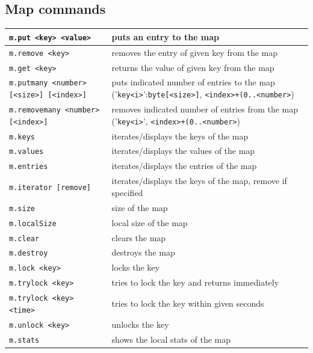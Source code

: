 \subsection*{Map commands}
\begin{tabular}{|p{4cm}|p{9cm}|}
    \hline
    \texttt{m.put <key> <value>} & puts an entry to the map\\\hline
    \texttt{m.remove <key>} & removes the entry of given key from the map\\\hline
    \texttt{m.get <key>} & returns the value of given key from the map\\\hline
    \texttt{m.putmany <number> [<size>] [<index>]} & puts indicated number of entries to the map ('\texttt{key<i>}':\texttt{byte[<size>]}, \texttt{<index>+(0..<number>})\\\hline
    \texttt{m.removemany <number> [<index>]} & removes indicated number of entries from the map ('\texttt{key<i>}', \texttt{<index>+(0..<number>})\\\hline
    \texttt{m.keys} & iterates/displays the keys of the map\\\hline
    \texttt{m.values} & iterates/displays the values of the map\\\hline
    \texttt{m.entries} & iterates/displays the entries of the map\\\hline
    \texttt{m.iterator [remove]} & iterates/displays the keys of the map, remove if specified\\\hline
    \texttt{m.size} & size of the map\\\hline
    \texttt{m.localSize} & local size of the map\\\hline
    \texttt{m.clear} & clears the map\\\hline
    \texttt{m.destroy} & destroys the map\\\hline
    \texttt{m.lock <key>} & locks the key\\\hline
    \texttt{m.trylock <key>} & tries to lock the key and returns immediately\\\hline
    \texttt{m.trylock <key> <time>} & tries to lock the key within given seconds\\\hline
    \texttt{m.unlock <key>} & unlocks the key\\\hline
    \texttt{m.stats} & shows the local stats of the map\\\hline
\end{tabular}
